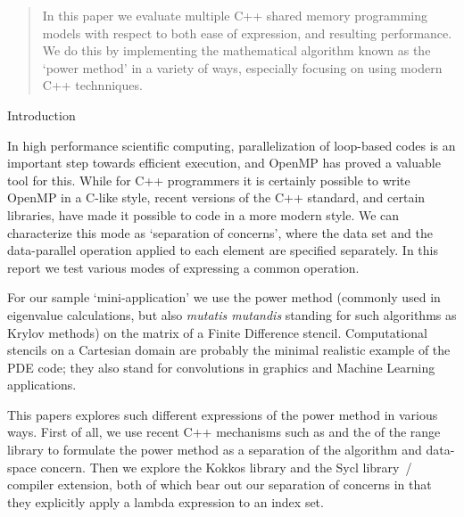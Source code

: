 
\begin{abstract}
  In this paper we evaluate multiple C++ shared memory
  programming models
  with respect to both ease of expression, and resulting performance.
  We do this by implementing the mathematical algorithm
  known as the `power method' in a variety of ways,
  especially focusing on using modern C++ technniques.
\end{abstract}

 {Introduction}

In high performance scientific computing,
parallelization of loop-based codes is an important
step towards efficient execution,
and OpenMP has proved a valuable tool for this.
While for C++ programmers it is certainly possible
to write OpenMP in a C-like style,
recent versions of the C++ standard,
and certain libraries,
have made it possible to code in a more modern style.
We can characterize this mode as `separation of concerns',
where the data set
and the data-parallel operation applied to each element
are specified separately.
In this report we test various modes of expressing
a common operation.

For our sample `mini-application' we use the power method
(commonly used in eigenvalue calculations, but also
\emph{mutatis mutandis} standing for such algorithms
as Krylov methods)
on the matrix of a Finite Difference stencil.
Computational stencils on a Cartesian domain are probably the minimal realistic
example of the PDE code; they also stand for convolutions
in graphics and Machine Learning applications.

This papers explores such different expressions of the power method
in various ways.
First of all, we use recent C++ mechanisms
such as  and the 
of the range library to formulate the power method
as a separation of the algorithm and data-space concern.
Then we explore the Kokkos library and the Sycl
library~/ compiler extension, both of which
bear out our separation of concerns
in that they explicitly apply a lambda expression to an index set.

